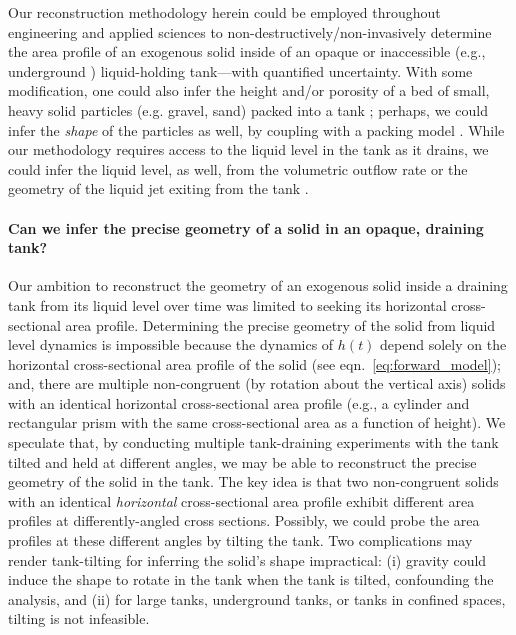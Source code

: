 \documentclass[a4paper,fleqn]{cas-dc}
\begin{document}
Our reconstruction methodology herein could be employed throughout engineering and applied sciences to non-destructively/non-invasively determine the area profile of an exogenous solid inside of an opaque or inaccessible (e.g., underground \cite{gephart2010short}) liquid-holding tank---with quantified uncertainty.
With some modification, one could also infer the height and/or porosity of a bed of small, heavy solid particles (e.g. gravel, sand) packed into a tank \cite{guellouz2020estimation}; perhaps, we could infer the \emph{shape} of the particles as well, by coupling with a packing model \cite{zhang2006relationship}. 
While our methodology requires access to the liquid level in the tank as it drains, we could infer the liquid level, as well, from the volumetric outflow rate or the geometry of the liquid jet exiting from the tank \cite{groetsch1999inverse,davidovic2020visualizing}.

\paragraph{Can we infer the precise geometry of a solid in an opaque, draining tank?}
Our ambition to reconstruct the geometry of an exogenous solid inside a draining tank from its liquid level over time was limited to seeking its horizontal cross-sectional area profile.
Determining the precise geometry of the solid from liquid level dynamics is impossible because the dynamics of $h(t)$ depend solely on the horizontal cross-sectional area profile of the solid (see eqn.~\ref{eq:forward_model}); and, there are multiple non-congruent (by rotation about the vertical axis) solids with an identical horizontal cross-sectional area profile (e.g., a cylinder and rectangular prism with the same cross-sectional area as a function of height). We speculate that, by conducting multiple tank-draining experiments with the tank tilted and held at different angles, we may be able to reconstruct the precise geometry of the solid in the tank. The key idea is that two non-congruent solids with an identical \emph{horizontal} cross-sectional area profile exhibit different area profiles at differently-angled cross sections.
Possibly, we could probe the area profiles at these different angles by tilting the tank. 
Two complications may render tank-tilting for inferring the solid's shape impractical: 
(i) gravity could induce the shape to rotate in the tank when the tank is tilted, confounding the analysis, and (ii) for large tanks, underground tanks, or tanks in confined spaces, tilting is not infeasible. 
\end{document}

